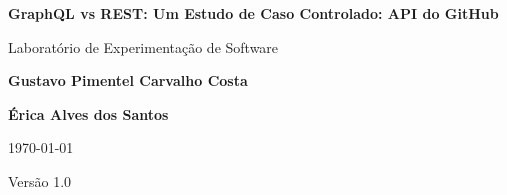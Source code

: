 \begin{titlepage}
\centering
\vspace*{3cm}

{\huge \textbf{GraphQL vs REST: Um Estudo de Caso Controlado: API do GitHub}\par}

\vspace{1.5cm}

{\Large Laboratório de Experimentação de Software\par}

\vspace{2cm}

{\large \textbf{Gustavo Pimentel Carvalho Costa}\par}

\vspace{0.5cm}

{\large \textbf{Érica Alves dos Santos}\par}

\vspace{2cm}

{\large \today\par}
{\large Versão 1.0\par}

\vfill
\end{titlepage}
